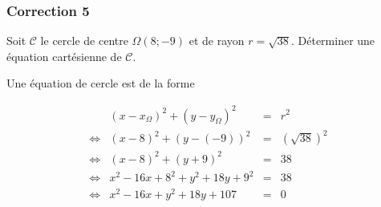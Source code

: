 \documentclass[15pt, mathserif]{beamer}
\begin{document}
\begin{frame}
\vspace{-10mm}
	\frametitle{Correction 5}
Soit $\mathcal{C}$ le cercle de centre $\Omega(8;-9)$ et de rayon $r=\sqrt{38}$. Déterminer une équation cartésienne de $\mathcal{C}$. 
 
 \bigskip 
 Une équation de cercle est de la forme 
 
 $$\begin{array}{crcl} 
 & (x-x_{\Omega})^2+(y-y_{\Omega})^2 & = &r^2 \\ 
 \Leftrightarrow & (x- 8)^2+(y-\left(-9\right))^2 & = & \left(\sqrt{38} \right)^2 \\ 
 \Leftrightarrow & (x-8)^2+(y+9)^2 & = &  38\\ 
 \Leftrightarrow & x^2-16x+8^2+y^2+18y+9^2& = &  38\\ 
 \Leftrightarrow & x^2-16x+y^2+18y+107 & = & 0 
 \end{array}$$ 
 
 \end{frame}
\end{document}
